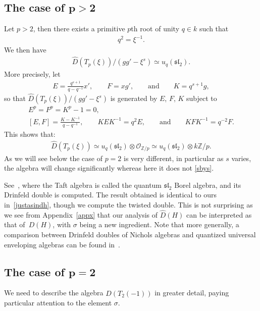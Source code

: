 \documentclass[10pt,a4paper]{amsart}
\numberwithin{equation}{section}
\newcommand{\ot}{\otimes}
\newcommand{\zp}{\mathbb{Z}/p}
\begin{document}
\subsection[The case of p>2]{The case of $\boldsymbol{p>2}$}
Let $p>2$, then there exists a primitive $p$th root of unity $q\in k$ such that
\begin{gather}
q^2=\xi^{-1}.
\end{gather}
We then have
\begin{gather}\label{sbys}
\widehat{D}(T_p(\xi))/(gg'-\xi^s)\simeq u_q({\mathfrak{sl}}_2).
\end{gather}
More precisely, let
\begin{gather}
E=\frac{q^{s+1}}{q-q^{-1}}x', \qquad
F=xg',\qquad\text{and}\qquad
K=q^{s+1}g,
\end{gather}
so that $\widehat{D}(T_p(\xi))/(gg'-\xi^s)$ is generated by $E$, $F$, $K$ subject to
\begin{gather*}
E^p=F^p=K^p-1=0,
\\
[E,F]=\frac{K-K^{-1}}{q-q^{-1}},\qquad
KEK^{-1}=q^2E,\qquad \text{and}\qquad KFK^{-1}=q^{-2}F.
\end{gather*}
This shows that:
\begin{gather}\label{justasindh}
\widehat{D}(T_p(\xi))\simeq u_q({\mathfrak{sl}}_2)\ot\mathcal{O}_{\zp}\simeq u_q({\mathfrak{sl}}_2)\ot k\zp.
\end{gather}
As we will see below the case of $p=2$ is very different, in particular as $s$ varies, the algebra will change significantly whereas here it does not \eqref{sbys}.

\begin{Remark}\label{DD}
See~\cite{uqsl2}, where the Taft algebra is called the quantum ${\mathfrak{sl}}_2$ Borel algebra, and its Drinfeld double is computed. The result obtained is identical to ours in~\eqref{justasindh}, though we compute the twisted double. This is not surprising as we see from Appendix~\ref{appx} that our analysis of $\widehat{D}(H)$ can be interpreted as that of~$D(H)$, with $\sigma$ being a new ingredient. Note that more generally, a comparison between Drinfeld doubles of Nichols algebras and quantized universal enveloping algebras can be found in~\cite{extra}.
\end{Remark}

\subsection[The case of p=2]{The case of $\boldsymbol{p=2}$}
We need to describe the algebra $\widehat{D}(T_2(-1))$ in greater detail, paying particular attention to the element $\sigma$.
\end{document}
